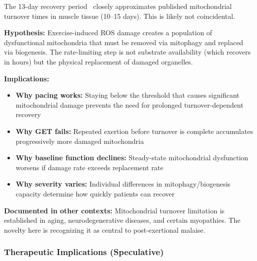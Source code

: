 \begin{open_question}
The 13-day recovery period~\cite{keller2024cpet} closely approximates published mitochondrial turnover times in muscle tissue (10--15 days). This is likely not coincidental.

\textbf{Hypothesis:} Exercise-induced ROS damage creates a population of dysfunctional mitochondria that must be removed via mitophagy and replaced via biogenesis. The rate-limiting step is not substrate availability (which recovers in hours) but the physical replacement of damaged organelles.

\textbf{Implications:}
\begin{itemize}
    \item \textbf{Why pacing works:} Staying below the threshold that causes significant mitochondrial damage prevents the need for prolonged turnover-dependent recovery
    \item \textbf{Why GET fails:} Repeated exertion before turnover is complete accumulates progressively more damaged mitochondria
    \item \textbf{Why baseline function declines:} Steady-state mitochondrial dysfunction worsens if damage rate exceeds replacement rate
    \item \textbf{Why severity varies:} Individual differences in mitophagy/biogenesis capacity determine how quickly patients can recover
\end{itemize}

\textbf{Documented in other contexts:} Mitochondrial turnover limitation is established in aging, neurodegenerative diseases, and certain myopathies. The novelty here is recognizing it as central to post-exertional malaise.
\end{open_question}

\subsubsection{Therapeutic Implications (Speculative)}

